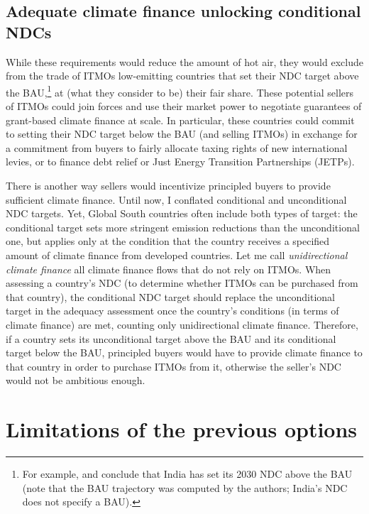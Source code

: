 \documentclass[12pt,english]{article}
\begin{document}
\subsection{Adequate climate finance unlocking conditional NDCs} %
While these requirements would reduce the amount of hot air, they would exclude from the trade of ITMOs low-emitting countries that set their NDC target above the BAU,\footnote{For example, \cite{van_den_berg_implications_2020} and \cite{unep_emissions_2025} conclude that India has set its 2030 NDC above the BAU (note that the BAU trajectory was computed by the authors; India's NDC does not specify a BAU). %
} 
at (what they consider to be) their fair share. These potential sellers of ITMOs could join forces and use their market power to negotiate guarantees of grant-based climate finance at scale. In particular, these countries could commit to setting their NDC target below the BAU (and selling ITMOs) in exchange for a commitment from buyers to fairly allocate taxing rights of new international levies, or to finance debt relief or Just Energy Transition Partnerships (JETPs). %

There is another way sellers would incentivize principled buyers to provide sufficient climate finance. Until now, I conflated conditional and unconditional NDC targets. 
Yet, Global South countries often include both types of target: the conditional target sets more stringent emission reductions than the unconditional one, but applies only at the condition that the country receives a specified amount of climate finance from developed countries. Let me call \textit{unidirectional climate finance} all climate finance flows that do not rely on ITMOs. When assessing a country's NDC (to determine whether ITMOs can be purchased from that country), the conditional NDC target should replace the unconditional target in the adequacy assessment %
once the country's conditions (in terms of climate finance) are met, counting only unidirectional climate finance. Therefore, if a country sets its unconditional target above the BAU and its conditional target below the BAU, principled buyers would have to provide climate finance to that country in order to purchase ITMOs from it, otherwise the seller's NDC would not be ambitious enough.

\section{Limitations of the previous options\label{subsec:limitations}}
\end{document}
